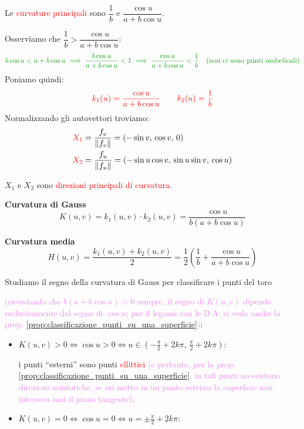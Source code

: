 \begin{esempio}
        Le \textcolor{red}{curvature principali} sono $\dfrac{1}{b}$ e $\dfrac{\cos u}{a + b \cos u}$.

        Osserviamo che $\dfrac{1}{b} > \dfrac{\cos u}{a + b \cos u}$:
        \[
        \color{verde} b \cos u < a + b \cos u \implies \frac{b \cos u}{a + b \cos u} < 1 \implies \frac{\cos u}{a + b \cos u} < \frac{1}{b} \quad (\text{non ci sono punti ombelicali})
        \]
        Poniamo quindi:
        \[
        \textcolor{red}{k_1(u) = \frac{\cos u}{a + b \cos u}} \qquad \textcolor{red}{k_2(u) = \frac{1}{b}}
        \]
        Normalizzando gli autovettori troviamo:
        \begin{align*}
        \color{red} X_1 &= \frac{f_v}{\lVert f_v\rVert} = (-\sin v, \, \cos v, \, 0) \\
        \color{red} X_2 &= \frac{f_u}{\lVert f_u\rVert} = (-\sin u \cos v, \, \sin u \sin v, \, \cos u)
        \end{align*}

        $X_1$ e $X_2$ sono \textcolor{red}{direzioni principali di curvatura}.

       \textbf{Curvatura di Gauss}
        \[
        K(u,v) = k_1(u,v) \cdot k_2(u,v) = \frac{\cos u}{b(a + b \cos u)}
        \]

        \textbf{Curvatura media}
        \[
        H(u,v) = \frac{k_1(u,v) + k_2(u,v)}{2} = \frac{1}{2} \left( \frac{1}{b} + \frac{\cos u}{a + b \cos u} \right)
        \]

        Studiamo il segno della curvatura di Gauss per classificare i punti del toro 
        
        \textcolor{violet}{(ricordando che $b(a + b \cos u) > 0$ sempre, il segno di $K(u,v)$ dipende esclusivamente dal segno di $\cos u$; per il legame con 
        le D.A. si veda anche la prop. \ref{prop:classificazione_punti_su_una_superficie})}:

        \begin{itemize}
            \item $K(u,v) > 0 \iff \cos u > 0 \iff u \in \left( -\frac{\pi}{2} + 2k\pi, \, \frac{\pi}{2} + 2k\pi \right)$:
            
            i punti ``esterni'' sono punti \textcolor{red}{ellittici} \textcolor{violet}{(e pertanto, per la prop. \ref{prop:classificazione_punti_su_una_superficie}, in tali punti no
            esistono direzioni asintotiche, se mi metto in un punto esterno la superficie non interseca mai il piano tangente)}.
            
            \item $K(u,v) = 0 \iff \cos u = 0 \iff u = \pm \frac{\pi}{2} + 2k\pi$:
            

\end{itemize}
\end{esempio}
